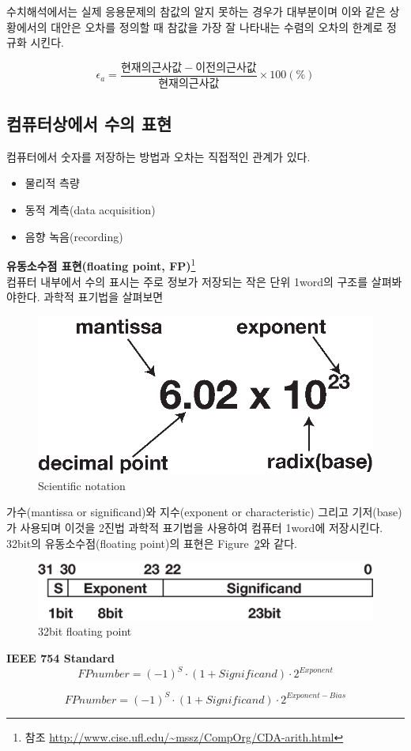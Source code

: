 수치해석에서는 실제 응용문제의 참값의 알지 못하는 경우가 대부분이며 이와 같은 상황에서의 대안은 오차를 정의할 때 참값을 가장 잘 나타내는 수렴의 오차의 한계로 정규화 시킨다.

\begin{equation}
\epsilon_{a}=\frac{현재의 근사값 - 이전의 근사값}{현재의 근사값} \times 100 (\%)
\label{eq:3-5}
\end{equation}

\subsection{컴퓨터상에서 수의 표현}
컴퓨터에서 숫자를 저장하는 방법과 오차는 직접적인 관계가 있다. 
\begin{itemize}
\item 물리적 측량
\item 동적 계측(data acquisition)
\item 음향 녹음(recording)
\end{itemize}

\textbf{유동소수점 표현(floating point, FP)}\footnote{참조 \url{http://www.cise.ufl.edu/~mssz/CompOrg/CDA-arith.html}}\\
컴퓨터 내부에서 수의 표시는 주로 정보가 저장되는 작은 단위 1word의 구조를 살펴봐야한다. 과학적 표기법을 살펴보면
\begin{figure}[!hbpt]
\centering
\includegraphics[keepaspectratio=true,width=0.3\linewidth]{figs/snfp.eps}
\caption{Scientific notation}
\label{fig:ex1}
\end{figure}

가수(mantissa or significand)와 지수(exponent or characteristic) 그리고 기저(base)가 사용되며 이것을 2진법 과학적 표기법을 사용하여 컴퓨터 1word에 저장시킨다. 32bit의 유동소수점(floating point)의 표현은 Figure~\ref{fig:ex2}와 같다.

\begin{figure}[!hbpt]
\centering
\includegraphics[keepaspectratio=true,width=0.6\linewidth]{figs/snfp2.eps}
\caption{32bit floating point}
\label{fig:ex2}
\end{figure}

\textbf{IEEE 754 Standard}\\

\begin{equation}
FPnumber = (-1)^{S}\cdot (1+Significand)\cdot 2^{Exponent}
\end{equation}

\begin{equation}
FPnumber = (-1)^{S}\cdot (1+Significand)\cdot 2^{Exponent-Bias}
\end{equation}

